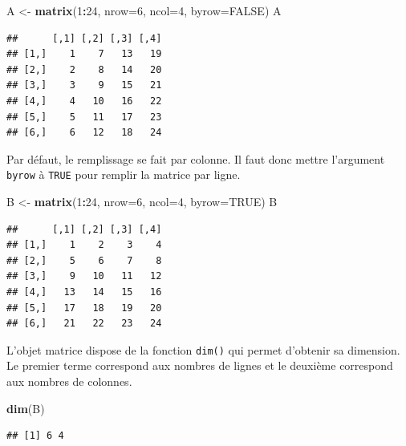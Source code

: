\documentclass[
]{book}
\newenvironment{Shaded}{\begin{snugshade}}{\end{snugshade}}
\newcommand{\AttributeTok}[1]{\textcolor[rgb]{0.13,0.29,0.53}{#1}}
\newcommand{\ConstantTok}[1]{\textcolor[rgb]{0.56,0.35,0.01}{#1}}
\newcommand{\DecValTok}[1]{\textcolor[rgb]{0.00,0.00,0.81}{#1}}
\newcommand{\FunctionTok}[1]{\textcolor[rgb]{0.13,0.29,0.53}{\textbf{#1}}}
\newcommand{\NormalTok}[1]{#1}
\newcommand{\OtherTok}[1]{\textcolor[rgb]{0.56,0.35,0.01}{#1}}
\newcommand{\SpecialCharTok}[1]{\textcolor[rgb]{0.81,0.36,0.00}{\textbf{#1}}}
\begin{document}
\begin{Shaded}
\begin{Highlighting}[]
\NormalTok{A }\OtherTok{\textless{}{-}} \FunctionTok{matrix}\NormalTok{(}\DecValTok{1}\SpecialCharTok{:}\DecValTok{24}\NormalTok{, }\AttributeTok{nrow=}\DecValTok{6}\NormalTok{, }\AttributeTok{ncol=}\DecValTok{4}\NormalTok{, }\AttributeTok{byrow=}\ConstantTok{FALSE}\NormalTok{)}
\NormalTok{A}
\end{Highlighting}
\end{Shaded}

\begin{verbatim}
##      [,1] [,2] [,3] [,4]
## [1,]    1    7   13   19
## [2,]    2    8   14   20
## [3,]    3    9   15   21
## [4,]    4   10   16   22
## [5,]    5   11   17   23
## [6,]    6   12   18   24
\end{verbatim}

Par défaut, le remplissage se fait par colonne. Il faut donc mettre l'argument \texttt{byrow} à \texttt{TRUE} pour remplir la matrice par ligne.

\begin{Shaded}
\begin{Highlighting}[]
\NormalTok{B }\OtherTok{\textless{}{-}} \FunctionTok{matrix}\NormalTok{(}\DecValTok{1}\SpecialCharTok{:}\DecValTok{24}\NormalTok{, }\AttributeTok{nrow=}\DecValTok{6}\NormalTok{, }\AttributeTok{ncol=}\DecValTok{4}\NormalTok{, }\AttributeTok{byrow=}\ConstantTok{TRUE}\NormalTok{)}
\NormalTok{B}
\end{Highlighting}
\end{Shaded}

\begin{verbatim}
##      [,1] [,2] [,3] [,4]
## [1,]    1    2    3    4
## [2,]    5    6    7    8
## [3,]    9   10   11   12
## [4,]   13   14   15   16
## [5,]   17   18   19   20
## [6,]   21   22   23   24
\end{verbatim}

L'objet matrice dispose de la fonction \texttt{dim()} qui permet d'obtenir sa dimension. Le premier terme correspond aux nombres de lignes et le deuxième correspond aux nombres de colonnes.

\begin{Shaded}
\begin{Highlighting}[]
\FunctionTok{dim}\NormalTok{(B)}
\end{Highlighting}
\end{Shaded}

\begin{verbatim}
## [1] 6 4
\end{verbatim}
\end{document}
